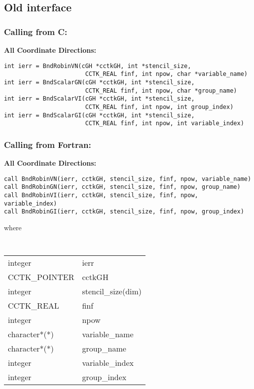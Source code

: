 \documentclass{article}
\begin{document}
\subsection{Old interface}

\subsubsection*{Calling from C:}

{\bf All Coordinate Directions:}
\begin{verbatim}
int ierr = BndRobinVN(cGH *cctkGH, int *stencil_size,  
                       CCTK_REAL finf, int npow, char *variable_name)
int ierr = BndScalarGN(cGH *cctkGH, int *stencil_size,  
                       CCTK_REAL finf, int npow, char *group_name)
int ierr = BndScalarVI(cGH *cctkGH, int *stencil_size,  
                       CCTK_REAL finf, int npow, int group_index)
int ierr = BndScalarGI(cGH *cctkGH, int *stencil_size,  
                       CCTK_REAL finf, int npow, int variable_index)
\end{verbatim}


\subsubsection*{Calling from Fortran:}
{\bf All Coordinate Directions:}
\begin{verbatim}
call BndRobinVN(ierr, cctkGH, stencil_size, finf, npow, variable_name)
call BndRobinGN(ierr, cctkGH, stencil_size, finf, npow, group_name)
call BndRobinVI(ierr, cctkGH, stencil_size, finf, npow, variable_index)
call BndRobinGI(ierr, cctkGH, stencil_size, finf, npow, group_index)
\end{verbatim}
where

{\tt
\begin{tabular}{ll}
integer & ierr \\
CCTK\_POINTER & cctkGH\\
integer & stencil\_size(dim)\\
CCTK\_REAL & finf \\
integer & npow \\
character*(*) & variable\_name\\
character*(*) & group\_name\\
integer & variable\_index\\
integer & group\_index\\
\end{tabular}
}
\end{document}
